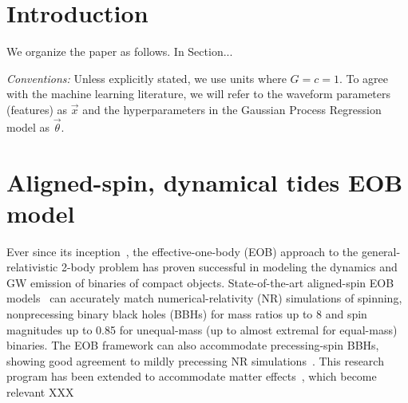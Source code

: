 \documentclass[prd,aps,letter,twocolumn,floatfix,notitlepage]{revtex4-1}
\begin{document}
\section{Introduction}



We organize the paper as follows. In Section...

\textit{Conventions:} Unless explicitly stated, we use units where $G=c=1$. To agree with the machine learning literature, we will refer to the waveform parameters (features) as $\vec x$ and the hyperparameters in the Gaussian Process Regression model as $\vec\theta$.

\section{Aligned-spin, dynamical tides EOB model}
Ever since its inception~\cite{Buonanno:1998gg}, the effective-one-body (EOB) approach to the general-relativistic 2-body problem has proven successful in modeling the dynamics and GW emission of binaries of compact objects. State-of-the-art aligned-spin EOB models~\cite{Bohe:2016gbl,Nagar:2017jdw} can accurately match numerical-relativity (NR) simulations of spinning, nonprecessing binary black holes (BBHs) for mass ratios up to 8 and spin magnitudes up to 0.85 for unequal-mass (up to almost extremal for equal-mass) binaries. The EOB framework can also accommodate precessing-spin BBHs, showing good agreement to mildly precessing NR simulations~\cite{Babak:2016tgq}. This research program has been extended to accommodate matter effects~\cite{}, which become relevant XXX
\end{document}
